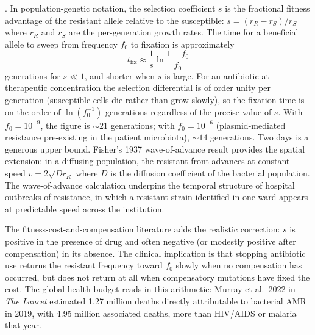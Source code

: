 . In
population-genetic notation, the selection coefficient $s$ is the
fractional fitness advantage of the resistant allele relative to the
susceptible: $s = (r_R - r_S)/r_S$ where $r_R$ and $r_S$ are the
per-generation growth rates. The time for a beneficial allele to
sweep from frequency $f_0$ to fixation is approximately
\[
t_{\mathrm{fix}} \approx \frac{1}{s} \ln \frac{1 - f_0}{f_0}
\]
generations for $s \ll 1$, and shorter when $s$ is large. For an
antibiotic at therapeutic concentration the selection differential is
of order unity per generation (susceptible cells die rather than grow
slowly), so the fixation time is on the order of $\ln(f_0^{-1})$
generations regardless of the precise value of $s$. With $f_0 =
10^{-9}$, the figure is $\sim 21$ generations; with $f_0 = 10^{-6}$
(plasmid-mediated resistance pre-existing in the patient
microbiota), $\sim 14$ generations. Two days is a generous upper
bound. Fisher's 1937 wave-of-advance result
\cite[pp.~355--369]{paper:v6c08-fisher-1937} provides the spatial
extension: in a diffusing population, the resistant front advances at
constant speed $v = 2\sqrt{D r_R}$ where $D$ is the diffusion
coefficient of the bacterial population. The wave-of-advance
calculation underpins the temporal structure of hospital outbreaks of
resistance, in which a resistant strain identified in one ward
appears at predictable speed across the institution.

The fitness-cost-and-compensation literature
\cite[pp.~260--271]{paper:v6c08-andersson-hughes-2010} adds the
realistic correction: $s$ is positive in the presence of drug and
often negative (or modestly positive after compensation) in its
absence. The clinical implication is that stopping antibiotic use
returns the resistant frequency toward $f_0$ slowly when no
compensation has occurred, but does not return at all when
compensatory mutations have fixed the cost. The global health
budget reads in this arithmetic: Murray et al.\ 2022 in \emph{The
Lancet} \cite[pp.~629--655]{paper:v6c08-murray-amr-2022} estimated
1.27 million deaths directly attributable to bacterial AMR in 2019,
with 4.95 million associated deaths, more than HIV/AIDS or malaria
that year.


